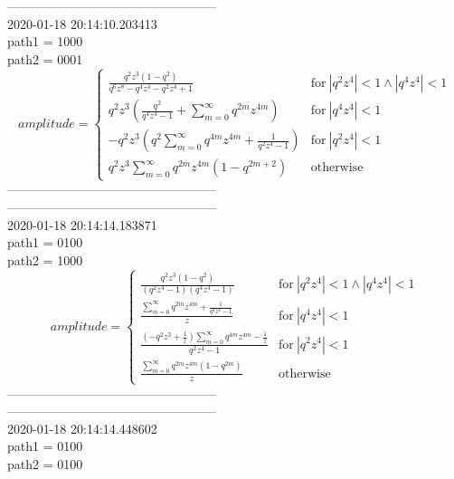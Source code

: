 --------------------------------------------------\\
2020-01-18 20:14:10.203413\\
path1 = 1000\\
path2 = 0001\\
$$amplitude = \begin{cases} \frac{q^{2} z^{3} \left(1 - q^{2}\right)}{q^{6} z^{8} - q^{4} z^{4} - q^{2} z^{4} + 1} & \text{for}\: \left|{q^{2} z^{4}}\right| < 1 \wedge \left|{q^{4} z^{4}}\right| < 1 \\q^{2} z^{3} \left(\frac{q^{2}}{q^{4} z^{4} - 1} + \sum_{m=0}^{\infty} q^{2 m} z^{4 m}\right) & \text{for}\: \left|{q^{4} z^{4}}\right| < 1 \\- q^{2} z^{3} \left(q^{2} \sum_{m=0}^{\infty} q^{4 m} z^{4 m} + \frac{1}{q^{2} z^{4} - 1}\right) & \text{for}\: \left|{q^{2} z^{4}}\right| < 1 \\q^{2} z^{3} \sum_{m=0}^{\infty} q^{2 m} z^{4 m} \left(1 - q^{2 m + 2}\right) & \text{otherwise} \end{cases}$$
--------------------------------------------------\\
--------------------------------------------------\\
2020-01-18 20:14:14.183871\\
path1 = 0100\\
path2 = 1000\\
$$amplitude = \begin{cases} \frac{q^{2} z^{3} \left(1 - q^{2}\right)}{\left(q^{2} z^{4} - 1\right) \left(q^{4} z^{4} - 1\right)} & \text{for}\: \left|{q^{2} z^{4}}\right| < 1 \wedge \left|{q^{4} z^{4}}\right| < 1 \\\frac{\sum_{m=0}^{\infty} q^{2 m} z^{4 m} + \frac{1}{q^{4} z^{4} - 1}}{z} & \text{for}\: \left|{q^{4} z^{4}}\right| < 1 \\\frac{\left(- q^{2} z^{3} + \frac{1}{z}\right) \sum_{m=0}^{\infty} q^{4 m} z^{4 m} - \frac{1}{z}}{q^{2} z^{4} - 1} & \text{for}\: \left|{q^{2} z^{4}}\right| < 1 \\\frac{\sum_{m=0}^{\infty} q^{2 m} z^{4 m} \left(1 - q^{2 m}\right)}{z} & \text{otherwise} \end{cases}$$
--------------------------------------------------\\
--------------------------------------------------\\
2020-01-18 20:14:14.448602\\
path1 = 0100\\
path2 = 0100\\
